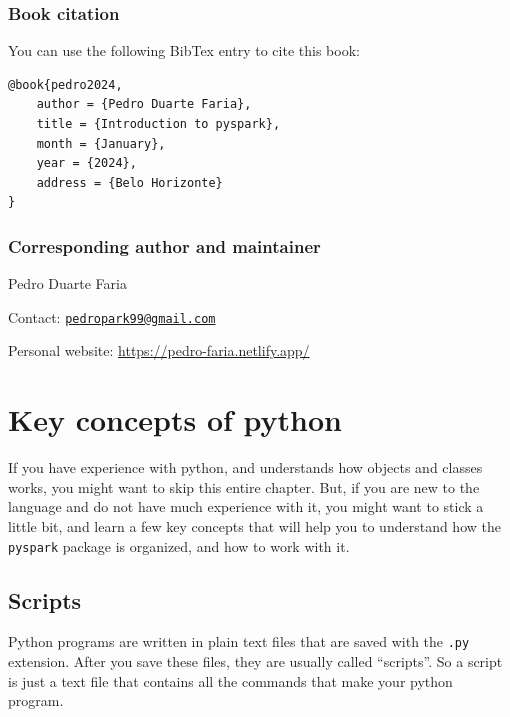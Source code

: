 \documentclass[
  11pt,
  letterpaper,
  DIV=11,
  numbers=noendperiod]{scrreprt}
\begin{document}
\subsection*{Book citation}\label{book-citation}

You can use the following BibTex entry to cite this book:

\begin{verbatim}
@book{pedro2024,
    author = {Pedro Duarte Faria},
    title = {Introduction to pyspark},
    month = {January},
    year = {2024},
    address = {Belo Horizonte}
}
\end{verbatim}

\subsection*{Corresponding author and
maintainer}\label{corresponding-author-and-maintainer}

Pedro Duarte Faria

Contact:
\href{mailto:pedropark99@gmail.com}{\nolinkurl{pedropark99@gmail.com}}

Personal website: \url{https://pedro-faria.netlify.app/}


\chapter{Key concepts of python}\label{key-concepts-of-python}

If you have experience with python, and understands how objects and
classes works, you might want to skip this entire chapter. But, if you
are new to the language and do not have much experience with it, you
might want to stick a little bit, and learn a few key concepts that will
help you to understand how the \texttt{pyspark} package is organized,
and how to work with it.

\section{Scripts}\label{scripts}

Python programs are written in plain text files that are saved with the
\texttt{.py} extension. After you save these files, they are usually
called ``scripts''. So a script is just a text file that contains all
the commands that make your python program.
\end{document}
